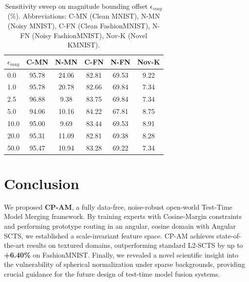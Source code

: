 \documentclass{article}
\theoremstyle{plain}
\theoremstyle{definition}
\theoremstyle{remark}
\begin{document}
\begin{table}[h]
\caption{Sensitivity sweep on magnitude bounding offset $\epsilon_{mag}$ (\%). Abbreviations: C-MN (Clean MNIST), N-MN (Noisy MNIST), C-FN (Clean FashionMNIST), N-FN (Noisy FashionMNIST), Nov-K (Novel KMNIST).}
\label{tab:mag_sweep}
\vskip 0.1in
\begin{center}
\begin{small}
\begin{sc}
\begin{tabular}{lccccc}
\toprule
$\epsilon_{mag}$ & C-MN & N-MN & C-FN & N-FN & Nov-K \\
\midrule
0.0 & 95.78 & 24.06 & 82.81 & 69.53 & 9.22 \\
1.0 & 95.78 & 20.78 & 82.66 & 69.84 & 7.34 \\
2.5 & 96.88 & 9.38 & 83.75 & 69.84 & 7.34 \\
5.0 & 94.06 & 10.16 & 84.22 & 67.81 & 8.75 \\
10.0 & 95.00 & 9.69 & 83.44 & 69.53 & 8.91 \\
20.0 & 95.31 & 11.09 & 82.81 & 69.38 & 8.28 \\
50.0 & 95.47 & 10.94 & 83.28 & 69.22 & 7.34 \\
\bottomrule
\end{tabular}
\end{sc}
\end{small}
\end{center}
\vskip -0.1in
\end{table}

\section{Conclusion}
\label{sec:conclusion}
We proposed \textbf{CP-AM}, a fully data-free, noise-robust open-world Test-Time Model Merging framework. By training experts with Cosine-Margin constraints and performing prototype routing in an angular, cosine domain with Angular SCTS, we established a scale-invariant feature space. CP-AM achieves state-of-the-art results on textured domains, outperforming standard L2-SCTS by up to \textbf{+6.40\%} on FashionMNIST. Finally, we revealed a novel scientific insight into the vulnerability of spherical normalization under sparse backgrounds, providing crucial guidance for the future design of test-time model fusion systems.




\clearpage
\appendix
\onecolumn
\end{document}

